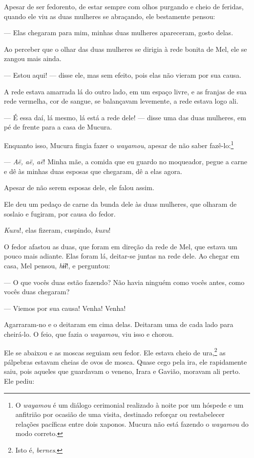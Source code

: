 Apesar de ser fedorento, de estar sempre com olhos purgando e cheio de
feridas, quando ele viu as duas mulheres se abraçando, ele bestamente
pensou:

--- Elas chegaram para mim, minhas duas mulheres apareceram, gosto
delas. 

Ao perceber que o olhar das duas mulheres se dirigia à rede bonita de
Mel, ele se zangou mais ainda. 

--- Estou aqui! --- disse ele, mas sem efeito, pois elas não vieram por
sua causa.

A rede estava amarrada lá do outro lado, em um espaço livre, e as
franjas de sua rede vermelha, cor de sangue, se balançavam levemente, a
rede estava logo ali. 

--- É essa daí, lá mesmo, lá está a rede dele! --- disse uma das duas
mulheres, em pé de frente para a casa de Mucura. 

Enquanto isso, Mucura fingia fazer o \textit{wayamou}, apesar de não saber
fazê-lo:\footnote{O \textit{wayamou} é um diálogo cerimonial realizado à noite por um hóspede e um anfitrião por ocasião de uma visita, destinado reforçar ou restabelecer relações pacíficas entre dois xaponos. Mucura não está fazendo o \textit{wayamou} do modo correto.} 

--- \textit{Aë, aë, aë}! Minha mãe, a comida que eu guardo no moqueador,
pegue a carne e dê às minhas duas esposas que chegaram, dê a elas
agora. 

Apesar de não serem esposas dele, ele falou assim. 

Ele deu um pedaço de carne da bunda dele às duas mulheres, que olharam
de soslaio e fugiram, por causa do fedor. 

\textit{Kuxu}!, elas fizeram, cuspindo, \textit{kuxu}!

O fedor afastou as duas, que foram em direção da rede de Mel, que estava um pouco mais adiante. Elas foram lá, deitar-se juntas na rede
dele. Ao chegar em casa, Mel pensou, \textit{hɨ̃ɨ}!, e perguntou:

--- O que vocês duas estão fazendo? Não havia ninguém como vocês antes,
como vocês duas chegaram?

--- Viemos por sua causa! Venha! Venha! 

Agarraram-no e o deitaram em cima delas. Deitaram uma de cada lado para
cheirá-lo. O feio, que fazia o \textit{wayamou}, viu isso e
chorou. 

Ele se abaixou e as moscas seguiam seu fedor. Ele estava cheio de
ura,\footnote{Isto é, \textit{bernes}.} as pálpebras estavam cheias de ovos de mosca.
Quase cego pela ira, ele rapidamente saiu, pois aqueles que guardavam o
veneno, Irara e Gavião, moravam ali perto. Ele pediu: 

